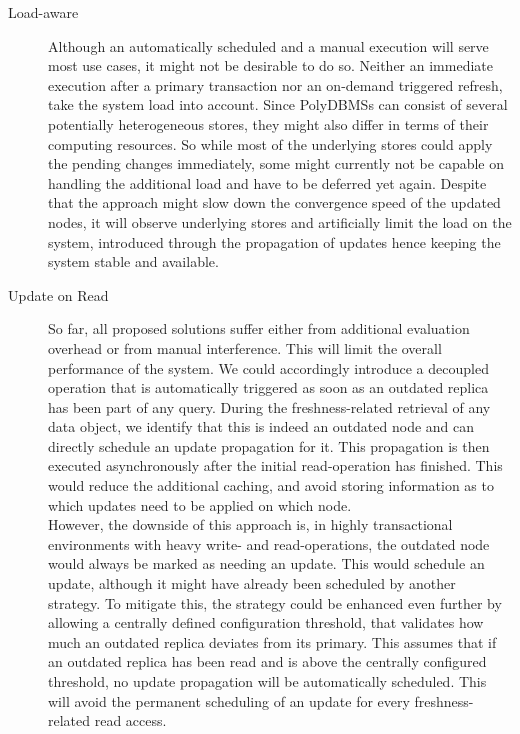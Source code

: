 \begin{description}
    \item[Load-aware] Although an automatically scheduled and a manual execution will serve most use cases, it might not be desirable to do so.
    Neither an immediate execution after a primary transaction nor an on-demand triggered refresh, take the system load into account.
    Since PolyDBMSs can consist of several potentially heterogeneous stores, they might also differ in terms of their computing resources.
    So while most of the underlying stores could apply the pending changes immediately, some might currently not be capable on handling the additional load and have to 
    be deferred yet again. Despite that the approach might slow down the convergence speed of the updated nodes, 
    it will observe underlying stores and artificially limit the load on the system, introduced through the propagation of updates hence keeping the system stable and available.

    \item[Update on Read] So far, all proposed solutions suffer either from additional evaluation overhead or from manual interference. This will limit the overall 
    performance of the system. We could accordingly introduce a decoupled operation that is automatically triggered as soon as an outdated replica has been part of any query. 
    During the freshness-related retrieval of any data object, we identify that this is indeed an outdated node and can directly schedule an update propagation for it. This propagation is then
    executed asynchronously after the initial read-operation has finished. This would reduce the additional caching, and avoid storing 
    information as to which updates need to be applied on which node.\\
    However, the downside of this approach is, in highly transactional environments with heavy write- and read-operations, the outdated node would always be marked as 
    needing an update. This would schedule an update, although it might have already been scheduled by another strategy. 
    To mitigate this, the strategy could be enhanced even further by allowing a centrally defined configuration threshold, that validates how much an outdated replica deviates from its primary. 
    This assumes that if an outdated replica has been read and is above the centrally configured threshold, no update propagation will be automatically scheduled.
    This will avoid the permanent scheduling of an update for every freshness-related read access.

\end{description}





